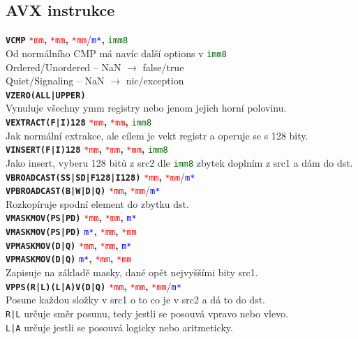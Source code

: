 \documentclass[
]{cz_sablona}
\newcommand{\reg}[1]{\texttt{\textcolor{red}{#1}}}
\newcommand{\mem}[1]{\texttt{\textcolor{blue}{#1}}}
\newcommand{\const}[1]{\texttt{\textcolor{darkgreen}{#1}}}
\newcommand{\instr}[1]{\texttt{\textbf{#1}}}
\begin{document}
\subsection{AVX instrukce}
\instr{VCMP} \reg{*mm}\textbf{,} \reg{*mm}\textbf{,} \reg{*mm}/\mem{m*}\textbf{,} \const{imm8}\\
Od normálního CMP má navíc další options v \const{imm8}\\
Ordered/Unordered -- NaN $\rightarrow$ false/true\\
Quiet/Signaling -- NaN $\rightarrow$ nic/exception
\\[0.5em]
\instr{VZERO(ALL|UPPER)}\\
Vynuluje všechny ymm registry nebo jenom jejich horní polovinu.
\\[0.5em]
\instr{VEXTRACT(F|I)128} \reg{*mm}\textbf{,} \reg{*mm}\textbf{,} \const{imm8}\\
Jak normální extrakce, ale cílem je vekt registr a operuje se s 128 bity.\\
\instr{VINSERT(F|I)128} \reg{*mm}\textbf{,} \reg{*mm}\textbf{,} \reg{*mm}\textbf{,} \const{imm8}\\
Jako insert, vyberu 128 bitů z src2 dle \const{imm8} zbytek doplním z src1 a dám do dst.
\\[0.5em]
\instr{VBROADCAST(SS|SD|F128|I128)} \reg{*mm}\textbf{,} \reg{*mm}/\mem{m*}\\
\instr{VPBROADCAST(B|W|D|Q)} \reg{*mm}\textbf{,} \reg{*mm}/\mem{m*}\\
Rozkopíruje spodní element do zbytku dst.\\
\instr{VMASKMOV(PS|PD)} \reg{*mm}\textbf{,} \reg{*mm}\textbf{,} \mem{m*}\\
\instr{VMASKMOV(PS|PD)} \mem{m*}\textbf{,} \reg{*mm}\textbf{,} \reg{*mm}\\
\instr{VPMASKMOV(D|Q)} \reg{*mm}\textbf{,} \reg{*mm}\textbf{,} \mem{m*}\\
\instr{VPMASKMOV(D|Q)} \mem{m*}\textbf{,} \reg{*mm}\textbf{,} \reg{*mm}\\
Zapisuje na základě masky, dané opět nejvyššími bity src1.
\\[0.5em]
\instr{VPPS(R|L)(L|A)V(D|Q)} \reg{*mm}\textbf{,} \reg{*mm}\textbf{,} \reg{*mm}/\mem{m*}\\
Posune každou složky v src1 o to co je v src2 a dá to do dst.\\
\texttt{R|L} určuje směr posunu, tedy jestli se posouvá vpravo nebo vlevo.\\
\texttt{L|A} určuje jestli se posouvá logicky nebo aritmeticky.
\end{document}
